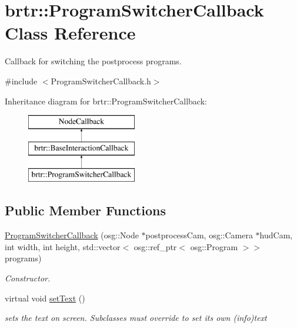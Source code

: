 \hypertarget{classbrtr_1_1_program_switcher_callback}{\section{brtr\+:\+:Program\+Switcher\+Callback Class Reference}
\label{classbrtr_1_1_program_switcher_callback}
}


Callback for switching the postprocess programs.  




{\ttfamily \#include $<$Program\+Switcher\+Callback.\+h$>$}

Inheritance diagram for brtr\+:\+:Program\+Switcher\+Callback\+:\begin{figure}[H]
\begin{center}
\leavevmode
\includegraphics[height=3.000000cm]{classbrtr_1_1_program_switcher_callback}
\end{center}
\end{figure}
\subsection*{Public Member Functions}
\begin{DoxyCompactItemize}
\item 
\hyperlink{classbrtr_1_1_program_switcher_callback_a36a59e70c5db59a00f2d7fd7fbf9e505}{Program\+Switcher\+Callback} (osg\+::\+Node $\ast$postprocess\+Cam, osg\+::\+Camera $\ast$hud\+Cam, int width, int height, std\+::vector$<$ osg\+::ref\+\_\+ptr$<$ osg\+::\+Program $>$$>$ programs)
\begin{DoxyCompactList}\small\item\em Constructor. \end{DoxyCompactList}\item 
virtual void \hyperlink{classbrtr_1_1_program_switcher_callback_a2202619d98a432578c8ed7342b957638}{set\+Text} ()
\begin{DoxyCompactList}\small\item\em sets the text on screen. Subclasses must override to set its own (info)text \end{DoxyCompactList}\end{DoxyCompactItemize}
